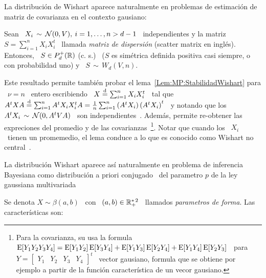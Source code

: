 La distribuci\'on  de Wishart aparece naturalmente en  problemas de estimaci\'on
de matriz de covarianza en el contexto gausiano:
%
\begin{lema}
  Sean \ $X_i \, \sim \, \mathcal{N}(0,V), \: i = 1, \ldots , n > d-1$ \ independientes y
  la  matriz  \  $S  =  \sum_{i=1}^n   X_i  X_i^t$  \  llamada  {\em  matriz  de
    dispersi\'on} (scatter matrix en ingl\'es). Entonces, \ $S \in P_d^+(\mathbb{R})$
  (c.   s.)   \  ($S$ es  sim\'etrica  definida  positiva  casi siempre,  o  con
  probabilidad uno) y \ $S \,\sim \, W_d(V,n)$.
\end{lema}
%
Este resultado  permite tambi\'en probar  el lema~\ref{Lem:MP:StabilidadWishart}
para \ $\nu = n$ \ entero  escribiendo \ $X \stackrel{\mathrm{d}}{=} \sum_{i=1}^n X_i X_i^t$ \ tal
que \ $A^t X A \stackrel{\mathrm{d}}{=} \sum_{i=1}^n A^t X_i X_i^t A = \frac1n \sum_{i=1}^n \left(
  A^t X_i \right)  \left( A^t X_i \right)^t$ \  y notando que los \  $A^t X_i \,
\sim \,  \mathcal{N}(0, A^t V  A)$ \ son independientes~\cite{Seb04}.   Adem\'as, permite
re-obtener las  expreciones del promedio y de  las covarianzas~\footnote{Para la
  covarianza, su usa la formula \ $\operatorname{E}[Y_1 Y_2 Y_3 Y_4] = \operatorname{E}[Y_1 Y_2]\operatorname{E}[Y_3
  Y_4]  + \operatorname{E}[Y_1 Y_3]\operatorname{E}[Y_2  Y_4] +  \operatorname{E}[Y_1 Y_4]\operatorname{E}[Y_2  Y_3]$ \  para $Y
  = \begin{bmatrix}  Y_1 & Y_2 &  Y_3 & Y_4 \end{bmatrix}^t$  \ vector gausiano,
  formula que se  obtiene por ejemplo a partir  de la funci\'on caracter\'istica
  de un vecor  gausiano.}. Notar que cuando los \ $X_i$  \ tienen un promemedio,
el  lema conduce  a  lo que  es  conocido como  Wishart no  central~\cite{And03,
  Seb04}.

La distribuci\'on  Wishart aparece as\'i naturalmente en  problema de inferencia
Bayesiana  como distribuci\'on  a  priori conjugado~
del parametro $p$ de la ley gaussiana multivariada~\cite{Rob07}


\label{Sssec:MP:Beta}

Se denota $X  \sim \beta(a,b)$ \ con  \ $(a,b) \in \mathbb{R}_+^{* \,  2}$ \ llamados
{\em parametros de forma}.  Las caracter\'isticas son:

